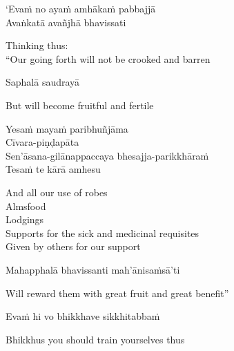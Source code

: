 `Evaṁ no ayaṁ amhākaṁ pabbajjā\\
Avaṅkatā avañjhā\makeatletter\hyperlink{endnote90-appendix}\makeatother
bhavissati

\begin{english}
  Thinking thus:\\
  ``Our going forth will not be crooked and barren\makeatletter\hyperlink{endnote91-appendix}\makeatother
\end{english}

Saphalā saudrayā

\begin{english}
  But will become fruitful and fertile
\end{english}

Yesaṁ mayaṁ paribhuñjāma\\
Cīvara-piṇḍapāta\\
Sen'āsana-gilānappaccaya bhesajja-parikkhāraṁ\\
Tesaṁ te kārā amhesu

\begin{english-verses}
  And all our use of robes\\
  Almsfood\\
  Lodgings\\
  Supports for the sick and medicinal requisites\makeatletter\hyperlink{endnote92-appendix}\makeatother\\
  Given by others for our support
\end{english-verses}

Mahapphalā bhavissanti mah'ānisaṁsā'ti

\begin{english}
  Will reward them with great fruit and great benefit''
\end{english}

Evaṁ hi vo bhikkhave sikkhitabbaṁ

\begin{english}
  Bhikkhus you should train yourselves thus
\end{english}

